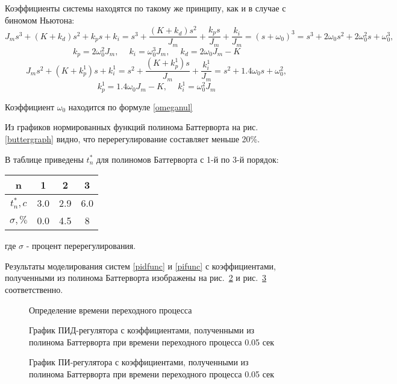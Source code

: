 Коэффициенты системы находятся по такому же принципу, как и в случае с биномом Ньютона:
\begin{equation}
	J_ms^3+(K+k_d)s^2+k_ps+k_i = s^3+\frac{(K+k_d)s^2}{J_m}+\frac{k_ps}{J_m} +\frac{k_i}{J_m} =(s+\omega_0)^3= s^3+2\omega_0s^2+2\omega_0^2s+\omega_0^3,
\end{equation}
\begin{equation}
	k_p = 2\omega_0^2J_m, \phantom{- }k_i = \omega_0^3J_m, \phantom{- } k_d=2\omega_0J_m - K
\end{equation}
\begin{equation}
	J_ms^2+(K+k_p^1)s+k_i^1 = s^2+\frac{(K+k_p^1)s}{J_m}+\frac{k_i^1}{J_m} = s^2+1.4\omega_0s+\omega_0^2,
\end{equation}
\begin{equation}
	k_p^1 =1.4\omega_0J_m-K, \phantom{- }k_i^1 = \omega_0^2J_m
\end{equation}

Коэффициент $\omega_0$ находится по формуле \eqref{omeganul}

Из графиков нормированных функций полинома Баттерворта на рис. \ref{buttergraph} видно, что перерегулирование составляет меньше 20\%.

В таблице приведены $t_n^*$ для полиномов Баттерворта с 1-й по 3-й порядок:
\begin{center}
\begin{tabular}{ |c|c|c|c| } 
 \hline
 n &  1 & 2 & 3  \\ 
 \hline
 $t_n^*, c$ &  3.0 & 2.9 & 6.0  \\ 
 \hline
 $\sigma, \%$ &  0.0 & 4.5 & 8  \\ 
 \hline
\end{tabular}
\end{center}
где $\sigma$ - процент перерегулирования. 

Результаты моделирования систем \eqref{pidfunc} и \eqref{pifunc} с коэффициентами, полученными из полинома Баттерворта изображены на рис.~\ref{pidmod2} и рис.~\ref{pimod2} соответственно.

\begin{figure}[h]
	\noindent{}
	\caption{Определение времени переходного процесса }
	\label{buttertime}
\end{figure}

\begin{figure}[h]
	\noindent{}
	\caption{График ПИД-регулятора с коэффициентами, полученными из полинома Баттерворта при времени переходного процесса 0.05 сек }
	\label{pidmod2}
\end{figure}

\begin{figure}[h]
	\noindent{}
	\caption{График ПИ-регулятора с коэффициентами, полученными из полинома Баттерворта при времени переходного процесса 0.05 сек }
	\label{pimod2}
\end{figure}
